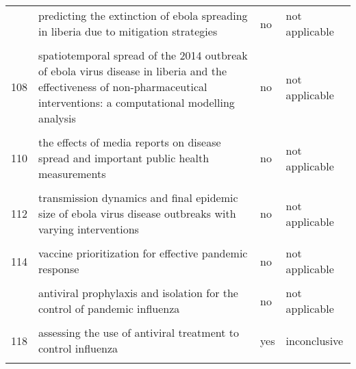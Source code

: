 \documentclass[
]{article}
\begin{document}
\begin{landscape}
\begin{longtable}{l>{\raggedright\arraybackslash}p{4cm}l>{\raggedright\arraybackslash}p{4cm}}
\addlinespace
106 & predicting the extinction of ebola spreading in liberia due to mitigation strategies & no & not applicable\\
\cellcolor{gray!6}{107} & \cellcolor{gray!6}{school closure strategies for the 2009 hong kong hini influenza pandemic} & \cellcolor{gray!6}{no} & \cellcolor{gray!6}{not applicable}\\
108 & spatiotemporal spread of the 2014 outbreak of ebola virus disease in liberia and the effectiveness of non-pharmaceutical interventions: a computational modelling analysis & no & not applicable\\
\cellcolor{gray!6}{109} & \cellcolor{gray!6}{strategies for early vaccination during novel influenza outbreaks} & \cellcolor{gray!6}{no} & \cellcolor{gray!6}{not applicable}\\
110 & the effects of media reports on disease spread and important public health measurements & no & not applicable\\
\addlinespace
\cellcolor{gray!6}{111} & \cellcolor{gray!6}{the impact of human behavioral changes in 2014 west africa ebola outbreak} & \cellcolor{gray!6}{no} & \cellcolor{gray!6}{not applicable}\\
112 & transmission dynamics and final epidemic size of ebola virus disease outbreaks with varying interventions & no & not applicable\\
\cellcolor{gray!6}{113} & \cellcolor{gray!6}{treatment–donation-stockpile dynamics in ebola convalescent blood transfusion therapy} & \cellcolor{gray!6}{no} & \cellcolor{gray!6}{not applicable}\\
114 & vaccine prioritization for effective pandemic response & no & not applicable\\
\cellcolor{gray!6}{115} & \cellcolor{gray!6}{a mathematical study of a tb model with treatment interruptions and two latent periods} & \cellcolor{gray!6}{no} & \cellcolor{gray!6}{not applicable}\\
\addlinespace
116 & antiviral prophylaxis and isolation for the control of pandemic influenza & no & not applicable\\
\cellcolor{gray!6}{117} & \cellcolor{gray!6}{assessing the impact of travel restrictions on international spread of the 2014 west african ebola epidemic} & \cellcolor{gray!6}{no} & \cellcolor{gray!6}{not applicable}\\
118 & assessing the use of antiviral treatment to control influenza & yes & inconclusive\\
\cellcolor{gray!6}{119} & \cellcolor{gray!6}{behavior in the time of cholera: evidence from the 2008-2009 cholera outbreak in zimbabwe} & \cellcolor{gray!6}{no} & \cellcolor{gray!6}{not applicable}\\

\end{longtable}
\end{landscape}
\end{document}
